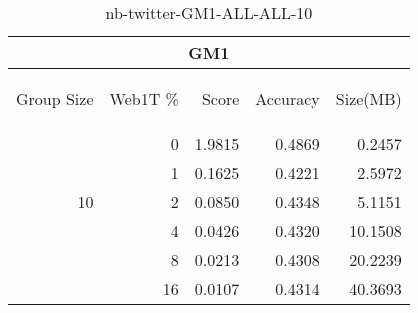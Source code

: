 \begin{center}
\begin{table}[htbp] 
 \begin{center}
\begin{tabular}{ | r | r | r | r | r |}
\hline
\multicolumn{5}{|c|}{GM1}\\
\hline
\begin{sideways}Group Size\end{sideways} & \begin{sideways}Web1T \%\end{sideways} & \begin{sideways}Score\end{sideways} & \begin{sideways}Accuracy\end{sideways} & \begin{sideways}Size(MB)\end{sideways}\\
\hline
\multirow{5}{*}{10}
 & 0 & 1.9815 & 0.4869 & 0.2457\\ \cline{2-5}
 & 1 & 0.1625 & 0.4221 & 2.5972\\ \cline{2-5}
 & 2 & 0.0850 & 0.4348 & 5.1151\\ \cline{2-5}
 & 4 & 0.0426 & 0.4320 & 10.1508\\ \cline{2-5}
 & 8 & 0.0213 & 0.4308 & 20.2239\\ \cline{2-5}
 & 16 & 0.0107 & 0.4314 & 40.3693\\ \cline{2-5}
\hline
\end{tabular}
\caption{nb-twitter-GM1-ALL-ALL-10}
\label{table:nb-twitter-GM1-ALL-ALL-10}
\end{center}
 \end{table}
\end{center}

